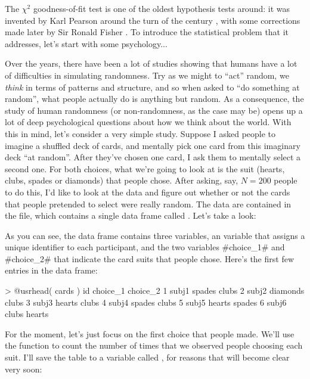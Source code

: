 The $\chi^2$ goodness-of-fit test is one of the oldest hypothesis tests around: it was invented by Karl Pearson around the turn of the century \cite{Pearson1900}, with some corrections made later by  Sir Ronald Fisher \cite{Fisher1922}. To introduce the statistical problem that it addresses, let's start with some psychology... 


Over the years, there have been a lot of studies showing that humans have a lot of difficulties in simulating randomness. Try as we might to ``act'' random, we {\it think} in terms of patterns and structure, and so when asked to ``do something at random'', what people actually do is anything but random. As a consequence, the study of human randomness (or non-randomness, as the case may be) opens up a lot of deep psychological questions about how we think about the world. With this in mind, let's consider a very simple study. Suppose I asked people to imagine a shuffled deck of cards, and mentally pick one card from this imaginary deck ``at random''. After they've chosen one card, I ask them to mentally select a second one. For both choices, what we're going to look at is the suit (hearts, clubs, spades or diamonds) that people chose. After asking, say, $N=200$ people to do this, I'd like to look at the data and figure out whether or not the cards that people pretended to select were really random. The data are contained in the  file, which contains a single data frame called . Let's take a look:
As you can see, the  data frame contains three variables, an  variable that assigns a unique identifier to each participant, and the two variables \rtextverb#choice_1# and \rtextverb#choice_2# that indicate the card suits that people chose. Here's the first few entries in the data frame:
\begin{rblock1}       
> @usr{head( cards )}
     id choice_1 choice_2
1 subj1   spades    clubs
2 subj2 diamonds    clubs
3 subj3   hearts    clubs
4 subj4   spades    clubs
5 subj5   hearts   spades
6 subj6    clubs   hearts
\end{rblock1}
For the moment, let's just focus on the first choice that people made. We'll use the  function to count the number of times that we observed people choosing each suit. I'll save the table to a variable called , for reasons that will become clear very soon:


